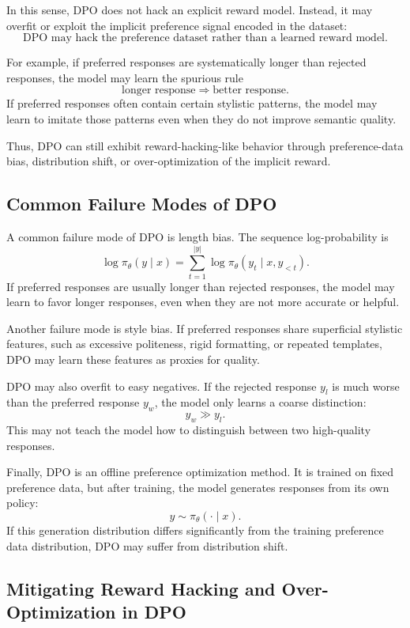 In this sense, DPO does not hack an explicit reward model. Instead, it may overfit or exploit the implicit preference signal encoded in the dataset:
\[
    \text{DPO may hack the preference dataset rather than a learned reward model.}
\]

For example, if preferred responses are systematically longer than rejected responses, the model may learn the spurious rule
\[
    \text{longer response} \Rightarrow \text{better response}.
\]
If preferred responses often contain certain stylistic patterns, the model may learn to imitate those patterns even when they do not improve semantic quality.

Thus, DPO can still exhibit reward-hacking-like behavior through preference-data bias, distribution shift, or over-optimization of the implicit reward.

\subsection{Common Failure Modes of DPO}

A common failure mode of DPO is length bias. The sequence log-probability is
\[
    \log \pi_\theta(y\mid x)
    =
    \sum_{t=1}^{|y|}
    \log \pi_\theta(y_t\mid x,y_{<t}).
\]
If preferred responses are usually longer than rejected responses, the model may learn to favor longer responses, even when they are not more accurate or helpful.

Another failure mode is style bias. If preferred responses share superficial stylistic features, such as excessive politeness, rigid formatting, or repeated templates, DPO may learn these features as proxies for quality.

DPO may also overfit to easy negatives. If the rejected response $y_l$ is much worse than the preferred response $y_w$, the model only learns a coarse distinction:
\[
    y_w \gg y_l.
\]
This may not teach the model how to distinguish between two high-quality responses.

Finally, DPO is an offline preference optimization method. It is trained on fixed preference data, but after training, the model generates responses from its own policy:
\[
    y\sim \pi_\theta(\cdot\mid x).
\]
If this generation distribution differs significantly from the training preference data distribution, DPO may suffer from distribution shift.

\subsection{Mitigating Reward Hacking and Over-Optimization in DPO}

